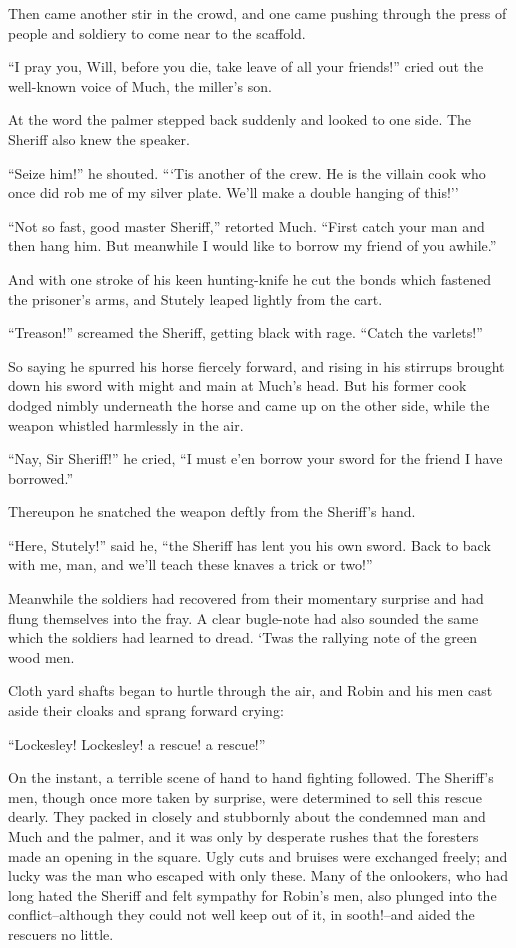 Then came another stir in the crowd, and one came pushing through the
press of people and soldiery to come near to the scaffold.

``I pray you, Will, before you die, take leave of all your friends!''
cried out the well-known voice of Much, the miller's son.

At the word the palmer stepped back suddenly and looked to one side. The
Sheriff also knew the speaker.

``Seize him!'' he shouted. ```Tis another of the crew. He is the villain
cook who once did rob me of my silver plate. We'll make a double hanging
of this!''

``Not so fast, good master Sheriff,'' retorted Much. ``First catch your
man and then hang him. But meanwhile I would like to borrow my friend of
you awhile.''

And with one stroke of his keen hunting-knife he cut the bonds which
fastened the prisoner's arms, and Stutely leaped lightly from the cart.

``Treason!'' screamed the Sheriff, getting black with rage. ``Catch the
varlets!''

So saying he spurred his horse fiercely forward, and rising in his
stirrups brought down his sword with might and main at Much's head. But
his former cook dodged nimbly underneath the horse and came up on the
other side, while the weapon whistled harmlessly in the air.

``Nay, Sir Sheriff!'' he cried, ``I must e'en borrow your sword for the
friend I have borrowed.''

Thereupon he snatched the weapon deftly from the Sheriff's hand.

``Here, Stutely!'' said he, ``the Sheriff has lent you his own sword.
Back to back with me, man, and we'll teach these knaves a trick or
two!''

Meanwhile the soldiers had recovered from their momentary surprise and
had flung themselves into the fray. A clear bugle-note had also sounded
the same which the soldiers had learned to dread. `Twas the rallying
note of the green wood men.

Cloth yard shafts began to hurtle through the air, and Robin and his men
cast aside their cloaks and sprang forward crying:

``Lockesley! Lockesley! a rescue! a rescue!''

On the instant, a terrible scene of hand to hand fighting followed. The
Sheriff's men, though once more taken by surprise, were determined to
sell this rescue dearly. They packed in closely and stubbornly about the
condemned man and Much and the palmer, and it was only by desperate
rushes that the foresters made an opening in the square. Ugly cuts and
bruises were exchanged freely; and lucky was the man who escaped with
only these. Many of the onlookers, who had long hated the Sheriff and
felt sympathy for Robin's men, also plunged into the conflict--although
they could not well keep out of it, in sooth!--and aided the rescuers no
little.


